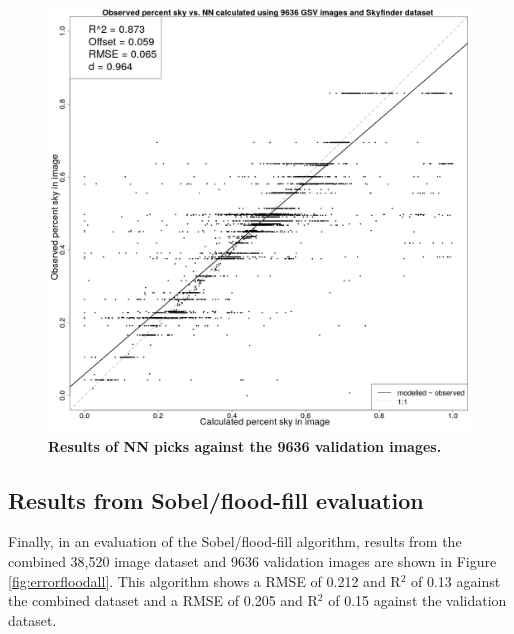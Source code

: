 \documentclass[final,3p,times,authoryear]{elsarticle}
\begin{document}
\begin{figure}
\centering
\includegraphics[scale=0.15]{Images/ErrorPlotsCNTK.png}
\caption{\textbf{Results of NN picks against the 9636 validation images.}}
\label{fig:errorplotscntk}
\end{figure}


\subsection{Results from Sobel/flood-fill evaluation}\label{sec:resultsflood}
Finally, in an evaluation of the Sobel/flood-fill algorithm, results from the combined 38,520 image dataset and 9636 validation images are shown in Figure \ref{fig:errorfloodall}. This algorithm shows a RMSE of 0.212 and R$^{2}$ of 0.13 against the combined dataset and a RMSE of 0.205 and R$^{2}$ of 0.15 against the validation dataset.
\end{document}
